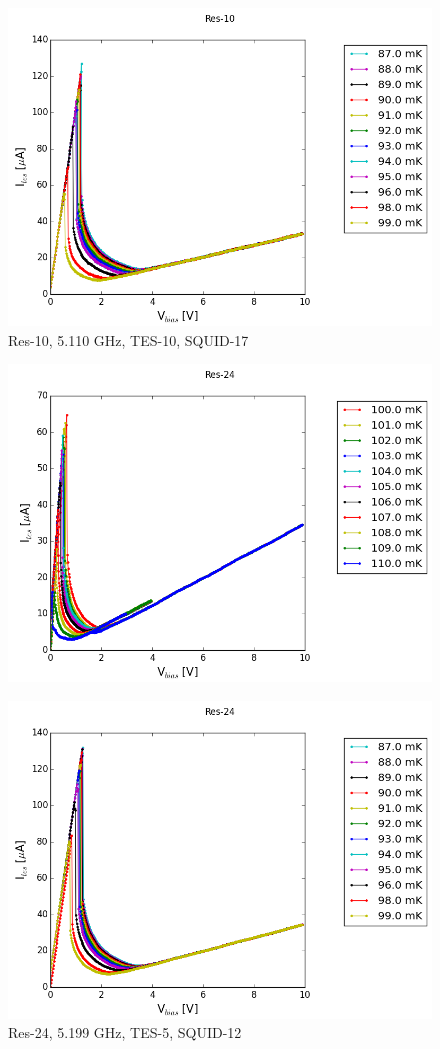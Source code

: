 \documentclass{article}
\begin{document}
\begin{figure}
\centering
\includegraphics[width=.8\linewidth,keepaspectratio]{Res-10_2}
\caption{Res-10, 5.110 GHz, TES-10, SQUID-17}
\end{figure}


\begin{figure}
\centering
\includegraphics[width=.8\linewidth,keepaspectratio]{Res-24_1}
\end{figure}

\begin{figure}
\centering
\includegraphics[width=.8\linewidth,keepaspectratio]{Res-24_2}
\caption{Res-24, 5.199 GHz, TES-5, SQUID-12}
\end{figure}
\end{document}

